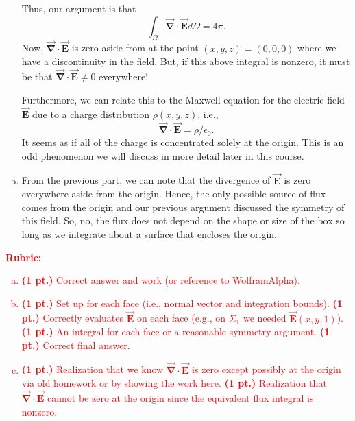 \documentclass[12pt]{article} %
\newcommand{\grad}{\boldsymbol{\vec{\nabla}}}
\newcommand{\vecfieldE}{\boldsymbol{\vec{E}}}
\begin{document}
\begin{solution}
\begin{enumerate}[(a)]
    Thus, our argument is that
    \[
    \int_\Omega \grad \cdot \vecfieldE d\Omega = 4\pi.
    \]
    Now, $\grad\cdot \vecfieldE$ is zero aside from at the point $(x,y,z)=(0,0,0)$ where we have a discontinuity in the field. But, if this above integral is nonzero, it must be that $\grad \cdot \vecfieldE \neq 0$ everywhere! 

    Furthermore, we can relate this to the Maxwell equation for the electric field $\vecfieldE$ due to a charge distribution $\rho(x,y,z)$, i.e.,
    \[
    \grad \cdot \vecfieldE = \rho/\epsilon_0.
    \]
    It seems as if all of the charge is concentrated solely at the origin. This is an odd phenomenon we will discuss in more detail later in this course.

    \item From the previous part, we can note that the divergence of $\vecfieldE$ is zero everywhere aside from the origin.  Hence, the only possible source of flux comes from the origin and our previous argument discussed the symmetry of this field.  So, no, the flux does not depend on the shape or size of the box so long as we integrate about a surface that encloses the origin.
    \end{enumerate}
\end{solution}
\vspace*{1cm}
\textcolor{red}{
\noindent \textbf{Rubric:}
\begin{enumerate}[(a)]
    \item \textbf{(1 pt.)} Correct answer and work (or reference to WolframAlpha).
    \item \textbf{(1 pt.)} Set up for each face (i.e., normal vector and integration bounds). \textbf{(1 pt.)} Correctly evaluates $\vecfieldE$ on each face (e.g., on $\Sigma_1$ we needed $\vecfieldE(x,y,1)$). \textbf{(1 pt.)} An integral for each face or a reasonable symmetry argument. \textbf{(1 pt.)} Correct final answer.
	\item \textbf{(1 pt.)} Realization that we know $\grad \cdot \vecfieldE$ is zero except possibly at the origin via old homework or by showing the work here. \textbf{(1 pt.)} Realization that $\grad \cdot \vecfieldE$ cannot be zero at the origin since the equivalent flux integral is nonzero. 
\end{enumerate}
}
\end{document}
